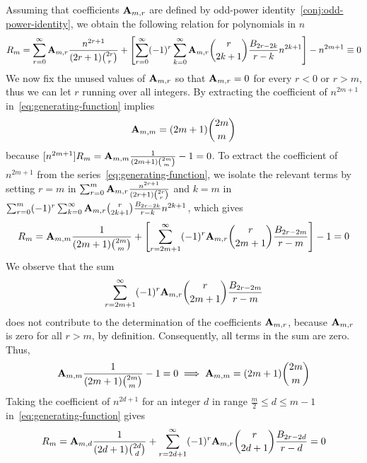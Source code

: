 Assuming that coefficients ${\mathbf{A}} \sb{m,r}$ are defined
by odd-power identity~\eqref{conj:odd-power-identity},
we obtain the following relation for polynomials in $n$
\begin{align}
    \label{eq:generating-function}
    R_{m} = \sum_{r=0}^{\infty} {\mathbf{A}} \sb{m,r} \frac{n^{2r+1}}{(2r+1) \binom{2r}{r}}
    + \left[ \sum_{r=0}^{\infty} (-1)^r \sum_{k=0}^{\infty} {\mathbf{A}} \sb{m,r} \binom{r}{2k+1} \frac{{B}\sb{2r-2k}}{r-k} n^{2k+1} \right]
    - n^{2m+1} \equiv 0
\end{align}
We now fix the unused values of ${\mathbf{A}} \sb{m,r}$ so that ${\mathbf{A}} \sb{m,r} = 0$ for every $r < 0$ or $r > m$,
thus we can let $r$ running over all integers.
By extracting the coefficient of $n^{2m+1}$ in~\eqref{eq:generating-function} implies
\begin{align*}
    {\mathbf{A}} \sb{m,m} = (2m+1)\binom{2m}{m}
\end{align*}
because $[n^{2m+1}]R_m = {\mathbf{A}} \sb{m,m} \frac{1}{(2m+1) \binom{2m}{m}} - 1 = 0$.
To extract the coefficient of $n^{2m+1}$ from the series~\eqref{eq:generating-function},
we isolate the relevant terms by setting $r = m$ in $\sum_{r=0}^{m} {\mathbf{A}} \sb{m,r} \frac{n^{2r+1}}{(2r+1) \binom{2r}{r}}$
and $k = m$ in $\sum_{r=0}^{m} (-1)^r \sum_{k=0}^{\infty} {\mathbf{A}} \sb{m,r} \binom{r}{2k+1} \frac{{B}\sb{2r-2k}}{r-k} n^{2k+1}$,
which gives
\begin{align*}
[n^{2m+1}]
    R_{m}
    = \coeffA{m}{m} \frac{1}{(2m+1) \binom{2m}{m}}
    + \left[ \sum_{r=2m+1}^{\infty} (-1)^r \coeffA{m}{r} \binom{r}{2m+1} \frac{\bernoulli{2r-2m}}{r-m} \right]
    - 1 = 0
\end{align*}
We observe that the sum
\begin{align*}
    \sum_{r=2m+1}^{\infty} (-1)^r {\mathbf{A}} \sb{m,r} \binom{r}{2m+1} \frac{{B}\sb{2r-2m}}{r-m}
\end{align*}
does not contribute to the determination of the coefficients ${\mathbf{A}} \sb{m,r}$, because ${\mathbf{A}} \sb{m,r}$ is zero
for all $r > m$, by definition.
Consequently, all terms in the sum are zero.
Thus,
\begin{align*}
    {\mathbf{A}} \sb{m,m} \frac{1}{(2m+1) \binom{2m}{m}}  - 1 = 0 \implies {\mathbf{A}} \sb{m,m} = (2m+1) \binom{2m}{m}
\end{align*}
Taking the coefficient of $n^{2d+1}$ for an integer $d$ in range $\frac{m}{2} \leq d \leq m-1$
in~\eqref{eq:generating-function} gives
\begin{align*}
[n^{2d+1}]
    R_m
    = \coeffA{m}{d} \frac{1}{(2d+1) \binom{2d}{d}}
    + \sum_{r=2d+1}^{\infty} (-1)^r \coeffA{m}{r} \binom{r}{2d+1} \frac{\bernoulli{2r-2d} }{r-d}
    = 0
\end{align*}
